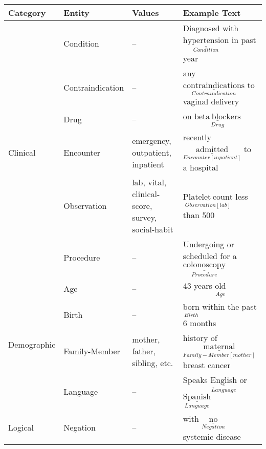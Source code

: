 \def\arraystretch{0.8}
\begin{tabular}{m{2cm} m{2.5cm} m{4.9cm} m{6.5cm}}
    \toprule
    \textbf{Category} & \textbf{Entity} & \textbf{Values} & \textbf{Example Text}\\
    \hline 
    &
        Condition 
            & --  
            & Diagnosed with $\underset{Condition}{\underline{\mathrm{hypertension}}}$ in past year \\
     & Contraindication
            & --
            & any $\underset{Contraindication}{\underline{\mathrm{contraindications}}}$ to vaginal delivery \\
     & Drug 
            & -- 
            & on $\underset{Drug}{\underline{\mathrm{beta\ blockers}}}$ \\
     Clinical & Encounter 
            & emergency, outpatient, inpatient 
            & recently $\underset{Encounter[inpatient]}{\underline{\mathrm{admitted}}}$ to a hospital \\
     & Observation
            & lab, vital, clinical-score, survey, social-habit
            & $\underset{Observation[lab]}{\underline{\mathrm{Platelet\ count}}}$ less than 500 \\
     & Procedure
            & -- 
            & Undergoing or scheduled for a $\underset{Procedure}{\underline{\mathrm{colonoscopy}}}$ \\[2ex]
    \hline       
    \multirow{4}{*}[-8pt]{\mbox{Demographic}} & 
        Age 
            & -- 
            & 43 years $\underset{Age}{\underline{\mathrm{old}}}$ \\
     & Birth
            & --
            & $\underset{Birth}{\underline{\mathrm{born}}}$ within the past 6 months \\
     & Family-Member 
            & mother, father, sibling, etc.
            & history of $\underset{Family-Member[mother]}{\underline{\mathrm{maternal}}}$ breast cancer \\
     & Language 
            & -- 
            & Speaks $\underset{Language}{\underline{\mathrm{English}}}$ or $\underset{Language}{\underline{\mathrm{Spanish}}}$  \\[2ex]
    \hline
    Logical &
       Negation 
            & -- 
            & with $\underset{Negation}{\underline{\mathrm{no}}}$ systemic disease \\
            
    \hline
    

\end{tabular}
